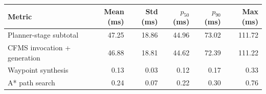 \begin{tabular}{lrrrrr}
  \toprule
  Metric & Mean (ms) & Std (ms) & \(p_{50}\) (ms) & \(p_{90}\) (ms) & Max (ms) \\
  \midrule
  Planner-stage subtotal & 47.25 & 18.86 & 44.96 & 73.02 & 111.72 \\
  CFMS invocation + generation & 46.88 & 18.81 & 44.62 & 72.39 & 111.22 \\
  Waypoint synthesis & 0.13 & 0.03 & 0.12 & 0.17 & 0.33 \\
  A* path search & 0.24 & 0.07 & 0.22 & 0.30 & 0.76 \\
  \bottomrule
\end{tabular}
